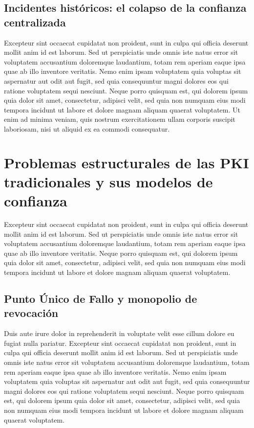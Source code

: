 \subsection{Incidentes históricos: el colapso de la confianza centralizada}

Excepteur sint occaecat cupidatat non proident, sunt in culpa qui officia deserunt mollit anim id est laborum. Sed ut perspiciatis unde omnis iste natus error sit voluptatem accusantium doloremque laudantium, totam rem aperiam eaque ipsa quae ab illo inventore veritatis. Nemo enim ipsam voluptatem quia voluptas sit aspernatur aut odit aut fugit, sed quia consequuntur magni dolores eos qui ratione voluptatem sequi nesciunt. Neque porro quisquam est, qui dolorem ipsum quia dolor sit amet, consectetur, adipisci velit, sed quia non numquam eius modi tempora incidunt ut labore et dolore magnam aliquam quaerat voluptatem. Ut enim ad minima veniam, quis nostrum exercitationem ullam corporis suscipit laboriosam, nisi ut aliquid ex ea commodi consequatur.


\section{Problemas estructurales de las PKI tradicionales y sus modelos de confianza}

Excepteur sint occaecat cupidatat non proident, sunt in culpa qui officia deserunt mollit anim id est laborum. Sed ut perspiciatis unde omnis iste natus error sit voluptatem accusantium doloremque laudantium, totam rem aperiam eaque ipsa quae ab illo inventore veritatis. Neque porro quisquam est, qui dolorem ipsum quia dolor sit amet, consectetur, adipisci velit, sed quia non numquam eius modi tempora incidunt ut labore et dolore magnam aliquam quaerat voluptatem.

\subsection{Punto Único de Fallo y monopolio de revocación}

Duis aute irure dolor in reprehenderit in voluptate velit esse cillum dolore eu fugiat nulla pariatur. Excepteur sint occaecat cupidatat non proident, sunt in culpa qui officia deserunt mollit anim id est laborum. Sed ut perspiciatis unde omnis iste natus error sit voluptatem accusantium doloremque laudantium, totam rem aperiam eaque ipsa quae ab illo inventore veritatis. Nemo enim ipsam voluptatem quia voluptas sit aspernatur aut odit aut fugit, sed quia consequuntur magni dolores eos qui ratione voluptatem sequi nesciunt. Neque porro quisquam est, qui dolorem ipsum quia dolor sit amet, consectetur, adipisci velit, sed quia non numquam eius modi tempora incidunt ut labore et dolore magnam aliquam quaerat voluptatem.

